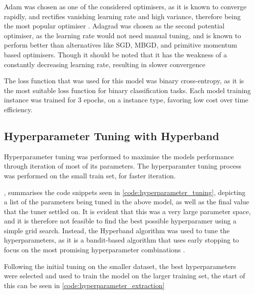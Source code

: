 Adam was chosen as one of the considered optimisers, as it is known to converge rapidly, and rectifies vanishing learning rate and high variance, therefore being the most popular optimiser \cite{RAIAAN2024100470}. Adagrad was chosen as the second potential optimiser, as the learning rate would not need manual tuning, and is known to perform better than alternatives like SGD, MBGD, and primitive momentum based optimisers. Though it should be noted that it has the weakness of a constantly decreasing learning rate, resulting in slower convergence \cite{RAIAAN2024100470}

The loss function that was used for this model was binary cross-entropy, as it is the most suitable loss function for binary classification tasks. Each model training instance was trained for 3 epochs, on a  instance type, favoring low cost over time efficiency.

\newpage

\subsection{Hyperparameter Tuning with Hyperband}

Hyperparameter tuning was performed to maximise the models performance through iteration of most of its parameters. The hyperparamter tuning process was performed on the small train set, for faster iteration.

, summarises the code snippets seen in \cref{code:hyperparameter_tuning}, depicting a list of the parameters being tuned in the above model, as well as the final value that the tuner settled on. It is evident that this was a very large parameter space, and it is therefore not feasible to find the best possible hyperparamer using a simple grid search. Instead, the Hyperband algorithm was used to tune the hyperparameters, as it is a bandit-based algorithm that uses early stopping to focus on the most promising hyperparameter combinations \cite{hyperband}.

Following the initial tuning on the smaller dataset, the best hyperparameters were selected and used to train the model on the larger training set, the start of this can be seen in \cref{code:hyperparameter_extraction}

